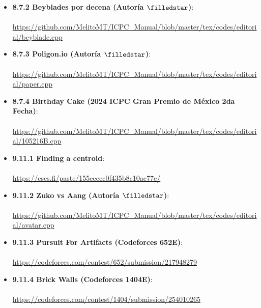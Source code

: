 \begin{itemize}
    \item \textbf{8.7.2 Beyblades por decena (Autoría $\filledstar$)}:
    \\\\ \url{https://github.com/MelitoMT/ICPC_Manual/blob/master/tex/codes/editorial/beyblade.cpp}
    \item \textbf{8.7.3 Poligon.io (Autoría $\filledstar$)}:
    \\\\ \url{https://github.com/MelitoMT/ICPC_Manual/blob/master/tex/codes/editorial/paper.cpp}
    \item \textbf{8.7.4 Birthday Cake (2024 ICPC Gran Premio de México 2da Fecha)}:
    \\\\ \url{https://github.com/MelitoMT/ICPC_Manual/blob/master/tex/codes/editorial/105216B.cpp}
    \item \textbf{9.11.1 Finding a centroid}:
    \\\\ \url{https://cses.fi/paste/155eeecc0f435b8c10ac77e/}
    \item \textbf{9.11.2 Zuko vs Aang (Autoría $\filledstar$)}:
    \\\\ \url{https://github.com/MelitoMT/ICPC_Manual/blob/master/tex/codes/editorial/avatar.cpp}
    \item \textbf{9.11.3 Pursuit For Artifacts (Codeforces 652E)}:
    \\\\ \url{https://codeforces.com/contest/652/submission/217948279}
    \item \textbf{9.11.4 Brick Walls (Codeforces 1404E)}:
    \\\\ \url{https://codeforces.com/contest/1404/submission/254010265}
\end{itemize}